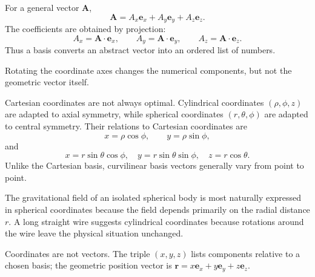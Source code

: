 For a general vector $\mathbf A$,
\[
\mathbf A=A_x\mathbf e_x+A_y\mathbf e_y+A_z\mathbf e_z.
\]
The coefficients are obtained by projection:
\[
A_x=\mathbf A\cdot\mathbf e_x,\qquad
A_y=\mathbf A\cdot\mathbf e_y,\qquad
A_z=\mathbf A\cdot\mathbf e_z.
\]
Thus a basis converts an abstract vector into an ordered list of numbers.

\begin{bookfigure}{Rotating the coordinate axes changes the numerical components, but not the geometric vector itself.}

\label{fig:coordinate-rotation}
\end{bookfigure}


Cartesian coordinates are not always optimal. Cylindrical coordinates $(\rho,\phi,z)$ are adapted to axial symmetry, while spherical coordinates $(r,\theta,\phi)$ are adapted to central symmetry. Their relations to Cartesian coordinates are
\[
x=\rho\cos\phi,\qquad y=\rho\sin\phi,
\]
and
\[
x=r\sin\theta\cos\phi,\quad
y=r\sin\theta\sin\phi,\quad
z=r\cos\theta.
\]
Unlike the Cartesian basis, curvilinear basis vectors generally vary from point to point.

\begin{examplebox}
The gravitational field of an isolated spherical body is most naturally expressed in spherical coordinates because the field depends primarily on the radial distance $r$. A long straight wire suggests cylindrical coordinates because rotations around the wire leave the physical situation unchanged.
\end{examplebox}

\begin{warningbox}
Coordinates are not vectors. The triple $(x,y,z)$ lists components relative to a chosen basis; the geometric position vector is $\mathbf r=x\mathbf e_x+y\mathbf e_y+z\mathbf e_z$.
\end{warningbox}
